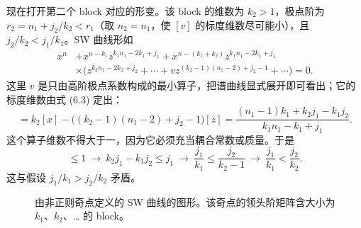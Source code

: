 现在打开第二个 block 对应的形变。该 block 的维数为 $k_2>1$，极点阶为 $r_2=n_1+j_2/k_2<r_1$（取 $n_2=n_1$，使 $[v]$ 的标度维数尽可能小），且 $j_2/k_2<j_1/k_1$。SW 曲线形如
\begin{equation}
\begin{aligned}
x^n &+ x^{n-k_1}z^{k_1n_1-2k_1+j_1}
+ x^{n-(k_1+k_2)}z^{k_1n_1-2k_1+j_1}\\
&\times\bigl(z^{k_2n_1-2k_2+j_2}+\cdots+vz^{(k_2-1)(n_1-2)+j_2-1}+\cdots\bigr) = 0 .
\end{aligned}
\label{eq:6.4}\tag{6.4}
\end{equation}
这里 $v$ 是只由高阶极点系数构成的最小算子，把谱曲线显式展开即可看出；它的标度维数由式 (6.3) 定出：
\begin{equation}
[v] = k_2[x]-\bigl((k_2-1)(n_1-2)+j_2-1\bigr)[z]
= \frac{(n_1-1)k_1+k_2j_1-k_1j_2}{k_1n_1-k_1+j_1} .
\label{eq:6.5}\tag{6.5}
\end{equation}
这个算子维数不得大于一，因为它必须充当耦合常数或质量。于是
\begin{equation}
[v]\le 1 \ \to\ k_2j_1-k_1j_2\le j_1
\ \to\ \frac{j_1}{k_1}\le\frac{j_2}{k_2-1}
\ \to\ \frac{j_1}{k_1}<\frac{j_2}{k_2} .
\label{eq:6.6}\tag{6.6}
\end{equation}
这与假设 $j_1/k_1>j_2/k_2$ 矛盾。


\begin{figure}[tbp]
\centering

\caption{由非正则奇点定义的 SW 曲线的图形。该奇点的领头阶矩阵含大小为 $k_1$、$k_2$、… 的 block。}
\label{fig:12}
\end{figure}

